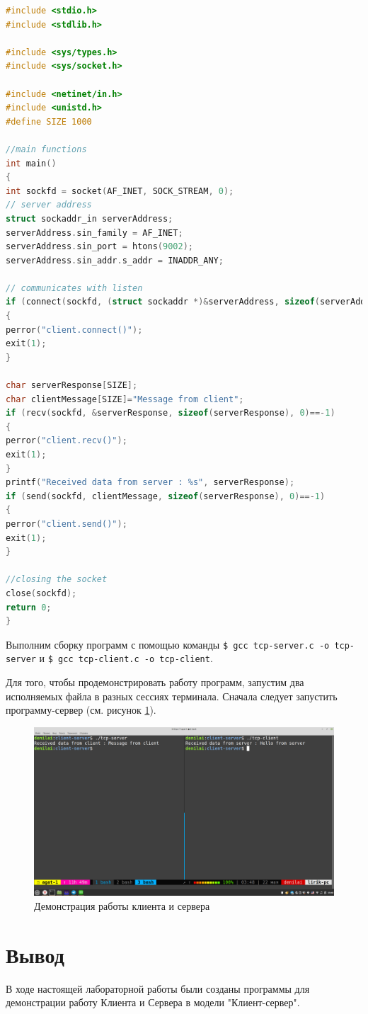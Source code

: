 \documentclass[a4paper,14pt]{extarticle}
\begin{document}
\begin{lstlisting}[language=C, caption={tcp-client.c}, label={lst:client}]
#include <stdio.h>
#include <stdlib.h>

#include <sys/types.h>
#include <sys/socket.h>

#include <netinet/in.h>
#include <unistd.h>
#define SIZE 1000

//main functions
int main()
{
int sockfd = socket(AF_INET, SOCK_STREAM, 0);
// server address
struct sockaddr_in serverAddress;
serverAddress.sin_family = AF_INET;
serverAddress.sin_port = htons(9002);
serverAddress.sin_addr.s_addr = INADDR_ANY;

// communicates with listen
if (connect(sockfd, (struct sockaddr *)&serverAddress, sizeof(serverAddress))!=0)
{
perror("client.connect()");
exit(1);
}

char serverResponse[SIZE];
char clientMessage[SIZE]="Message from client";
if (recv(sockfd, &serverResponse, sizeof(serverResponse), 0)==-1)
{
perror("client.recv()");
exit(1);
}
printf("Received data from server : %s", serverResponse);
if (send(sockfd, clientMessage, sizeof(serverResponse), 0)==-1)
{
perror("client.send()");
exit(1);
}

//closing the socket
close(sockfd);
return 0;
}

\end{lstlisting}


Выполним сборку программ с помощью команды \texttt{\$ gcc tcp-server.c -o tcp-server} и  \texttt{\$ gcc tcp-client.c -o tcp-client}.

Для того, чтобы продемонстрировать работу программ, запустим два исполняемых файла в разных сессиях терминала. Сначала следует запустить программу-сервер (см. рисунок \ref{fig:demo3}).

\begin{figure}[h!]
	\centering
	\includegraphics[width=0.9\linewidth]{images/7/demo3}
	\caption{Демонстрация работы клиента и сервера}
	\label{fig:demo3}
\end{figure}
 
\newpage
\section*{Вывод}

В ходе настоящей лабораторной работы были созданы программы для демонстрации работу Клиента и Сервера в модели "Клиент-сервер".
\end{document}
